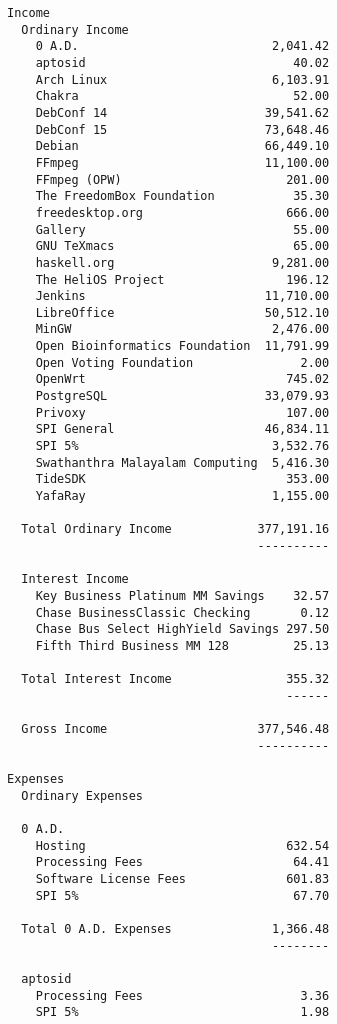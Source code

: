 \documentclass[letterpaper]{report}
\begin{document}
\begin{verbatim}
Income
  Ordinary Income
    0 A.D.                           2,041.42
    aptosid                             40.02
    Arch Linux                       6,103.91
    Chakra                              52.00
    DebConf 14                      39,541.62
    DebConf 15                      73,648.46
    Debian                          66,449.10
    FFmpeg                          11,100.00
    FFmpeg (OPW)                       201.00
    The FreedomBox Foundation           35.30
    freedesktop.org                    666.00
    Gallery                             55.00
    GNU TeXmacs                         65.00
    haskell.org                      9,281.00
    The HeliOS Project                 196.12
    Jenkins                         11,710.00
    LibreOffice                     50,512.10
    MinGW                            2,476.00
    Open Bioinformatics Foundation  11,791.99
    Open Voting Foundation               2.00
    OpenWrt                            745.02
    PostgreSQL                      33,079.93
    Privoxy                            107.00
    SPI General                     46,834.11
    SPI 5%                           3,532.76
    Swathanthra Malayalam Computing  5,416.30
    TideSDK                            353.00
    YafaRay                          1,155.00

  Total Ordinary Income            377,191.16
                                   ----------

  Interest Income
    Key Business Platinum MM Savings    32.57
    Chase BusinessClassic Checking       0.12
    Chase Bus Select HighYield Savings 297.50
    Fifth Third Business MM 128         25.13

  Total Interest Income                355.32
                                       ------

  Gross Income                     377,546.48
                                   ----------
 
Expenses
  Ordinary Expenses

  0 A.D.
    Hosting                            632.54
    Processing Fees                     64.41
    Software License Fees              601.83
    SPI 5%                              67.70

  Total 0 A.D. Expenses              1,366.48
                                     --------

  aptosid
    Processing Fees                      3.36
    SPI 5%                               1.98


\end{verbatim}
\end{document}
